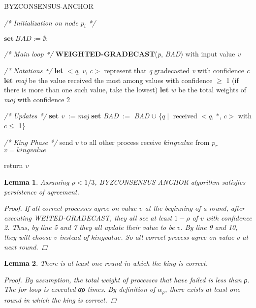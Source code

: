 \documentclass[conference]{IEEEtran}
\newtheorem{l1}{Lemma}
\begin{document}
\begin{algorithm}
\caption{BYZCONSENSUS-ANCHOR}\label{euclid}
\textit{/* Initialization on node $p_i$ */}
\begin{algorithmic}[1]
\STATE $\textbf{set} ~\textit{BAD} := \emptyset;$
\item[]
\item[]
\textit{/* Main loop */}
\STATE \textbf{WEIGHTED-GRADECAST}(\textit{p}, \textit{BAD}) with input value \textit{v}
\item[]
\item[]
\textit{/* Notations */}
\STATE \textbf{let} $<$\textit{q}, \textit{v}, \textit{c}$>$ represent that \textit{q} gradecasted \textit{v} with confidence \textit{c}
\STATE \textbf{let} \textit{maj} be the value received the most among values with confidence $\geq$ 1
(if there is more than one such value, take the lowest)
\STATE \textbf{let} $w$ be the total weights of \textit{maj} with confidence 2
\item[]
\item[]
\textit{/* Updates */}
\STATE \textbf{set} \textit{v} $:=$\textit{maj}
\STATE \textbf{set} \textit{BAD} $:=$ \textit{BAD} $\cup$ \{$q \mid$ received $<q$, $\ast$, $c>$ with $c \leq$ 1\}
\item[]
\item[]
\textit{/* King Phase */}
\STATE send $v$ to all other process
\ENDIF
\STATE receive $kingvalue$ from $p_r$
\STATE $v = kingvalue$ 
\ENDIF
\ENDFOR
\item[]
\STATE return \textit{v}

\end{algorithmic}
\end{algorithm}

\begin{l1} 
Assuming $\rho < 1/3$, BYZCONSENSUS-ANCHOR algorithm satisfies persistence of agreement.
\begin{proof}
If all correct processes agree on value $v$ at the beginning of a round, after executing WEITED-GRADECAST, they all see at least $1 - \rho$ of $v$ with confidence 2. Thus,  by line  5 and 7 they all update their value to be $v$. By line 9 and 10, they will choose $v$ instead of $kingvalue$. So all correct process agree on value $v$ at next round.  
\end{proof}
\end{l1}

\begin{l1}
There is at least one round in which the king is correct.
\begin{proof}
By assumption, the total weight of processes that
have failed is less than ρ. The for loop is executed αρ times.
By definition of $\alpha_\rho$, there exists at least one round in which
the king is correct.
\end{proof}
\end{l1}
\end{document}
